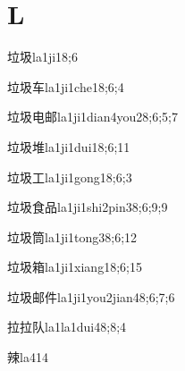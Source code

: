 \section*{L}

\begin{verbete}{垃圾}{la1ji1}{8;6}
\end{verbete}

\begin{verbete}{垃圾车}{la1ji1che1}{8;6;4}
\end{verbete}

\begin{verbete}{垃圾电邮}{la1ji1dian4you2}{8;6;5;7}
\end{verbete}

\begin{verbete}{垃圾堆}{la1ji1dui1}{8;6;11}
\end{verbete}

\begin{verbete}{垃圾工}{la1ji1gong1}{8;6;3}
\end{verbete}

\begin{verbete}{垃圾食品}{la1ji1shi2pin3}{8;6;9;9}
\end{verbete}

\begin{verbete}{垃圾筒}{la1ji1tong3}{8;6;12}
\end{verbete}

\begin{verbete}{垃圾箱}{la1ji1xiang1}{8;6;15}
\end{verbete}

\begin{verbete}{垃圾邮件}{la1ji1you2jian4}{8;6;7;6}
\end{verbete}

\begin{verbete}{拉拉队}{la1la1dui4}{8;8;4}
\end{verbete}

\begin{verbete}{辣}{la4}{14}
\end{verbete}

